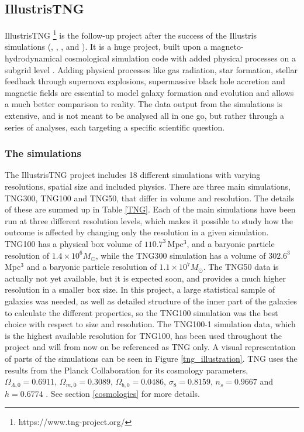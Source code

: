 \subsection{IllustrisTNG}
IllustrisTNG \footnote{https://www.tng-project.org/} is the follow-up project after the success of the Illustris simulations (\textcite{Springel2017}, \textcite{Pillepich2017}, \textcite{Naiman2018}, \textcite{Nelson2017} and \textcite{Marinacci2018}). It is a huge project, built upon a magneto-hydrodynamical cosmological simulation code with added physical processes on a subgrid level \parencite{Weinberger2016}. Adding physical processes like gas radiation, star formation, stellar feedback through supernova explosions, supermassive black hole accretion and magnetic fields are essential to model galaxy formation and evolution and allows a much better comparison to reality. The data output from the simulations is extensive, and is not meant to be analysed all in one go, but rather through a series of analyses, each targeting a specific scientific question. 


\subsubsection{The simulations}
The IllustrisTNG project includes 18 different simulations with varying resolutions, spatial size and included physics. There are three main simulations, TNG300, TNG100 and TNG50, that differ in volume and resolution. The details of these are summed up in Table \ref{TNG}. Each of the main simulations have been run at three different resolution levels, which makes it possible to study how the outcome is affected by changing only the resolution in a given simulation. TNG100 has a physical box volume of $110.7^3 \, $Mpc$^3$, and a baryonic particle resolution of $1.4 \times 10^6 M_{\odot}$, while the TNG300 simulation has a volume of $302.6^3 \, $Mpc$^3$ and a baryonic particle resolution of $1.1 \times 10^7 M_{\odot}$. The TNG50 data is actually not yet available, but it is expected soon, and provides a much higher resolution in a smaller box size. In this project, a large statistical sample of galaxies was needed, as well as detailed structure of the inner part of the galaxies to calculate the different properties, so the TNG100 simulation was the best choice with respect to size and resolution. The TNG100-1 simulation data, which is the highest available resolution for TNG100, has been used throughout the project and will from now on be referenced as TNG only. A visual representation of parts of the simulations can be seen in Figure \ref{tng_illustration}. TNG uses the results from the Planck Collaboration for its cosmology parameters, $\Omega_{\Lambda,0} = 0.6911$, $\Omega_{m,0}=0.3089$, $\Omega_{b,0}=0.0486$, $\sigma_8=0.8159$, $n_s=0.9667$ and $h = 0.6774$ \parencite{Planck2016}. See section \ref{cosmologies} for more details.

